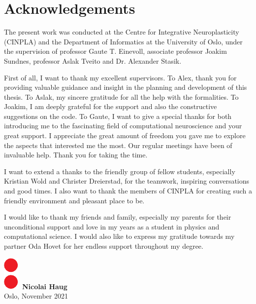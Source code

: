 \chapter*{Acknowledgements}
\thispagestyle{plain}

The present work was conducted at the Centre for Integrative Neuroplasticity (CINPLA) and the Department of Informatics at the University of Oslo, under the supervision of professor Gaute T. Einevoll, associate professor Joakim Sundnes, professor Aslak Tveito and Dr. Alexander Stasik. 

First of all, I want to thank my excellent supervisors. To Alex, thank you for providing valuable guidance and insight in the planning and development of this thesis. To Aslak, my sincere gratitude for all the help with the formalities. To Joakim, I am deeply grateful for the support and also the constructive suggestions on the code. To Gaute, I want to give a special thanks for both introducing me to the fascinating field of computational neuroscience and your great support. I appreciate the great amount of freedom you gave me to explore the aspects that interested me the most. Our regular meetings have been of invaluable help. Thank you for taking the time. 

I want to extend a thanks to the friendly group of fellow students, especially Kristian Wold and Christer Dreierstad, for the teamwork, inspiring conversations and good times. I also want to thank the members of CINPLA for creating such a friendly environment and pleasant place to be. 

I would like to thank my friends and family, especially my parents for their unconditional support and love in my years as a student in physics and computational science. I would also like to express my gratitude towards my partner Oda Hovet for her endless support throughout my degree. 
\\ [8 pt]


\begin{flushright}
\includegraphics[height = 1.5ex]{latex/latex-report/3_Images/Logo/UiO/uio-colon.pdf}\, \textbf{Nicolai Haug}
\\
Oslo, November 2021
\end{flushright}
